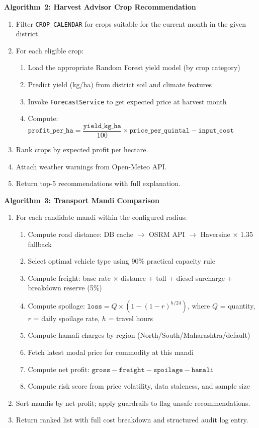 \documentclass[12pt,a4paper]{report}
\begin{document}
\textbf{Algorithm~2: Harvest Advisor Crop Recommendation}

\begin{enumerate}
    \item Filter \texttt{CROP\_CALENDAR} for crops suitable for the current month in
    the given district.
    \item For each eligible crop:
    \begin{enumerate}
        \item Load the appropriate Random Forest yield model (by crop category)
        \item Predict yield (kg/ha) from district soil and climate features
        \item Invoke \texttt{ForecastService} to get expected price at harvest month
        \item Compute:\quad
        $\texttt{profit\_per\_ha} = \dfrac{\texttt{yield\_kg\_ha}}{100} \times
        \texttt{price\_per\_quintal} - \texttt{input\_cost}$
    \end{enumerate}
    \item Rank crops by expected profit per hectare.
    \item Attach weather warnings from Open-Meteo API.
    \item Return top-5 recommendations with full explanation.
\end{enumerate}

\textbf{Algorithm~3: Transport Mandi Comparison}

\begin{enumerate}
    \item For each candidate mandi within the configured radius:
    \begin{enumerate}
        \item Compute road distance: DB cache $\rightarrow$ OSRM API $\rightarrow$
        Haversine $\times$ 1.35 fallback
        \item Select optimal vehicle type using 90\% practical capacity rule
        \item Compute freight: base rate $\times$ distance + toll + diesel surcharge +
        breakdown reserve (5\%)
        \item Compute spoilage: $\texttt{loss} = Q \times (1-(1-r)^{h/24})$,
        where $Q$ = quantity, $r$ = daily spoilage rate, $h$ = travel hours
        \item Compute hamali charges by region (North/South/Maharashtra/default)
        \item Fetch latest modal price for commodity at this mandi
        \item Compute net profit: $\texttt{gross} - \texttt{freight} -
        \texttt{spoilage} - \texttt{hamali}$
        \item Compute risk score from price volatility, data staleness, and sample size
    \end{enumerate}
    \item Sort mandis by net profit; apply guardrails to flag unsafe recommendations.
    \item Return ranked list with full cost breakdown and structured audit log entry.
\end{enumerate}
\end{document}
